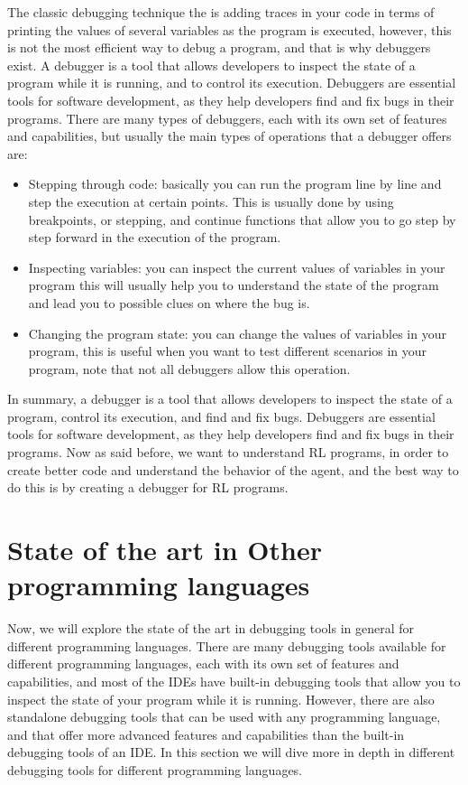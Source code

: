 The classic debugging technique the is adding traces in your code in terms of printing the 
values of several variables as the program is executed, however, this is not the most 
efficient way to debug a program, and that is why debuggers exist. A debugger is a tool 
that allows developers to inspect the state of a program while it is running, and to 
control its execution. Debuggers are essential tools for software development, as they 
help developers find and fix bugs in their programs. There are many types of 
debuggers, each with its own set of features and capabilities, but usually the main 
types of operations that a debugger offers\cite{10.5555/1457534} are:

\begin{itemize}
    \item Stepping through code: basically you can run the program line by line and step 
    the execution at certain points. This is usually done by using breakpoints, or stepping, 
    and continue functions that allow you to go step by step forward in the execution of
    the program.
    \item Inspecting variables: you can inspect the current values of variables in your 
    program this will usually help you to understand the state of the program and lead you 
    to possible clues on where the bug is.
    \item Changing the program state: you can change the values of variables in your program, 
    this is useful when you want to test different scenarios in your program, note that not
    all debuggers allow this operation.
\end{itemize}

In summary, a debugger is a tool that allows developers to inspect the state of a program,
control its execution, and find and fix bugs. Debuggers are essential tools for software 
development, as they help developers find and fix bugs in their programs. Now as said before, 
we want to understand \ac{RL} programs, in order to create better code and understand the behavior
of the agent, and the best way to do this is by creating a debugger for \ac{RL} programs.

\section{State of the art in Other programming languages}
\label{sec:other}
Now, we will explore the state of the art in debugging tools in general for different 
programming languages. There are many debugging tools available for different programming 
languages, each with its own set of features and capabilities, and most of the IDEs have 
built-in debugging tools that allow you to inspect the state of your program while it is 
running. However, there are also standalone debugging tools that can be used with any 
programming language, and that offer more advanced features and capabilities than the 
built-in debugging tools of an IDE. In this section we will dive more in depth in different 
debugging tools for different programming languages.

